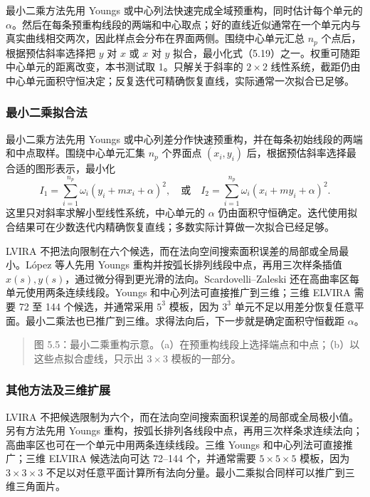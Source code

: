 \documentclass[11pt,a4paper,openany,fontset=none]{ctexbook}
\begin{document}
最小二乘方法先用 Youngs 或中心列法快速完成全域预重构，同时估计每个单元的 $\alpha$。然后在每条预重构线段的两端和中心取点；好的直线近似通常在一个单元内与真实曲线相交两次，因此样点会分布在界面两侧。围绕中心单元汇总 $n_p$ 个点后，根据预估斜率选择把 $y$ 对 $x$ 或 $x$ 对 $y$ 拟合，最小化式（5.19）之一。权重可随距中心单元的距离改变，本书测试取 1。只解关于斜率的 $2\times2$ 线性系统，截距仍由中心单元面积守恒决定；反复迭代可精确恢复直线，实际通常一次拟合已足够。

\subsubsection{最小二乘拟合法}

最小二乘方法先用 Youngs 或中心列差分作快速预重构，并在每条初始线段的两端和中点取样。围绕中心单元汇集 $n_p$ 个界面点 $(x_i,y_i)$ 后，根据预估斜率选择最合适的图形表示，最小化
\begin{equation}
I_1=\sum_{i=1}^{n_p}\omega_i(y_i+mx_i+\alpha)^2,
\quad\text{或}\quad
I_2=\sum_{i=1}^{n_p}\omega_i(x_i+my_i+\alpha)^2.
\tag{5.19}
\end{equation}
这里只对斜率求解小型线性系统，中心单元的 $\alpha$ 仍由面积守恒确定。迭代使用拟合结果可在少数迭代内精确恢复直线；多数实际计算做一次拟合已经足够。

LVIRA 不把法向限制在六个候选，而在法向空间搜索面积误差的局部或全局最小。López 等人先用 Youngs 重构并按弧长排列线段中点，再用三次样条插值 $x(s),y(s)$，通过微分得到更光滑的法向。Scardovelli--Zaleski 还在高曲率区每单元使用两条连续线段。Youngs 和中心列法可直接推广到三维；三维 ELVIRA 需要 72 至 144 个候选，并通常采用 $5^3$ 模板，因为 $3^3$ 单元不足以用差分恢复任意平面。最小二乘法也已推广到三维。求得法向后，下一步就是确定面积守恒截距 $\alpha$。

\begin{quote}\small 图 5.5：最小二乘重构示意。（a）在预重构线段上选择端点和中点；（b）以这些点拟合虚线，只示出 $3\times3$ 模板的一部分。\end{quote}
\subsubsection{其他方法及三维扩展}

LVIRA 不把候选限制为六个，而在法向空间搜索面积误差的局部或全局极小值。另有方法先用 Youngs 重构，按弧长排列各线段中点，再用三次样条求连续法向；高曲率区也可在一个单元中用两条连续线段。三维 Youngs 和中心列法可直接推广；三维 ELVIRA 候选法向可达 72--144 个，并通常需要 $5\times5\times5$ 模板，因为 $3\times3\times3$ 不足以对任意平面计算所有法向分量。最小二乘拟合同样可以推广到三维三角面片。
\end{document}
